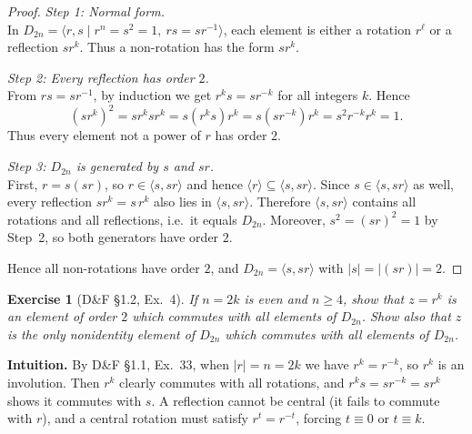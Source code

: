 \documentclass[12pt]{article}
\newtheorem{exercise}[theorem]{Exercise}
\theoremstyle{definition}
\begin{document}
\dotfill

\begin{proof}
\noindent\emph{Step 1: Normal form.}\\

\noindent
In $D_{2n}=\langle r,s\mid r^{n}=s^{2}=1,\ rs=sr^{-1}\rangle$, each element is either a
rotation $r^{\ell}$ or a reflection $sr^{k}$. Thus a non-rotation has the form $sr^{k}$.

\dotfill

\noindent\emph{Step 2: Every reflection has order $2$.}\\

\noindent
From $rs=sr^{-1}$, by induction we get $r^{k}s = sr^{-k}$ for all integers $k$. Hence
\[
(sr^{k})^{2}=sr^{k}sr^{k}=s(r^{k}s)r^{k}=s(sr^{-k})r^{k}=s^{2}r^{-k}r^{k}=1.
\]
Thus every element not a power of $r$ has order $2$.

\dotfill

\noindent\emph{Step 3: $D_{2n}$ is generated by $s$ and $sr$.}\\

\noindent
First, $r = s(sr)$, so $r\in\langle s, sr\rangle$ and hence $\langle r\rangle\subseteq\langle s, sr\rangle$.
Since $s\in\langle s, sr\rangle$ as well, every reflection $sr^{k}=s\,r^{k}$ also lies in
$\langle s, sr\rangle$. Therefore $\langle s, sr\rangle$ contains all rotations and all reflections,
i.e.\ it equals $D_{2n}$. Moreover, $s^{2}=(sr)^{2}=1$ by Step~2, so both generators have order $2$.

\dotfill

Hence all non-rotations have order $2$, and $D_{2n}=\langle s, sr\rangle$ with $|s|=|(sr)|=2$.
\end{proof}


\newpage

\begin{exercise}[D\&F §1.2, Ex.~4]
If $n=2k$ is even and $n\ge 4$, show that $z=r^{k}$ is an element of order $2$ which commutes
with all elements of $D_{2n}$. Show also that $z$ is the only nonidentity element of $D_{2n}$
which commutes with all elements of $D_{2n}$.
\end{exercise}

\dotfill

\noindent
\textbf{Intuition.}
By D\&F §1.1, Ex.~33, when $|r|=n=2k$ we have $r^{k}=r^{-k}$, so $r^{k}$ is an involution.
Then $r^{k}$ clearly commutes with all rotations, and $r^{k}s=sr^{-k}=sr^{k}$ shows it commutes with $s$.
A reflection cannot be central (it fails to commute with $r$), and a central rotation must satisfy
$r^{t}=r^{-t}$, forcing $t\equiv0$ or $t\equiv k$.
\end{document}
